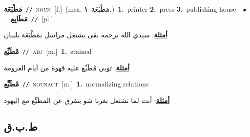 \documentclass[10pt,a4paper,twoside]{article} %
\begin{document}
\begin{multicols}{2}
{\setlength\topsep{0pt}\textbf{\foreignlanguage{arabic}{مَطْبَعَة}}\ {\color{gray}\texttt{//}\color{black}}\ \textsc{noun}\ [f.]\ \color{gray}(msa. \foreignlanguage{arabic}{مَطْبَعَة}~\foreignlanguage{arabic}{\textbf{١.}})\color{black}\ \textbf{1.}~printer  \textbf{2.}~press  \textbf{3.}~publishing house\ \ $\bullet$\ \ \setlength\topsep{0pt}\textbf{\foreignlanguage{arabic}{مَطَابِع}}\ {\color{gray}\texttt{//}\color{black}}\ [pl.]\  \begin{flushright}\color{gray}\foreignlanguage{arabic}{\textbf{\underline{\foreignlanguage{arabic}{أمثلة}}}: سيدي الله يرحمه بقى يشتغل مراسل بمَطْبَعَة بلبنان}\end{flushright}\color{black}} \vspace{2mm}

{\setlength\topsep{0pt}\textbf{\foreignlanguage{arabic}{مْطَبِّع}}\ {\color{gray}\texttt{//}\color{black}}\ \textsc{adj}\ [m.]\ \textbf{1.}~stained\  \begin{flushright}\color{gray}\foreignlanguage{arabic}{\textbf{\underline{\foreignlanguage{arabic}{أمثلة}}}: ثوبي مْطَبِّع عليه قهوة من أيام العزومة}\end{flushright}\color{black}} \vspace{2mm}

{\setlength\topsep{0pt}\textbf{\foreignlanguage{arabic}{مْطَبِّع}}\ {\color{gray}\texttt{//}\color{black}}\ \textsc{noun\textunderscore act}\ [m.]\ \textbf{1.}~normalizing relations\  \begin{flushright}\color{gray}\foreignlanguage{arabic}{\textbf{\underline{\foreignlanguage{arabic}{أمثلة}}}: أنت لما تشتغل بغربا شو بتفرق عن المطَبِّع مع اليهود}\end{flushright}\color{black}} \vspace{2mm}

\vspace{-3mm}
\subsection*{\color{blue}\foreignlanguage{arabic}{ط.ب.ق}\color{blue}{}} 


\end{multicols}
\end{document}
